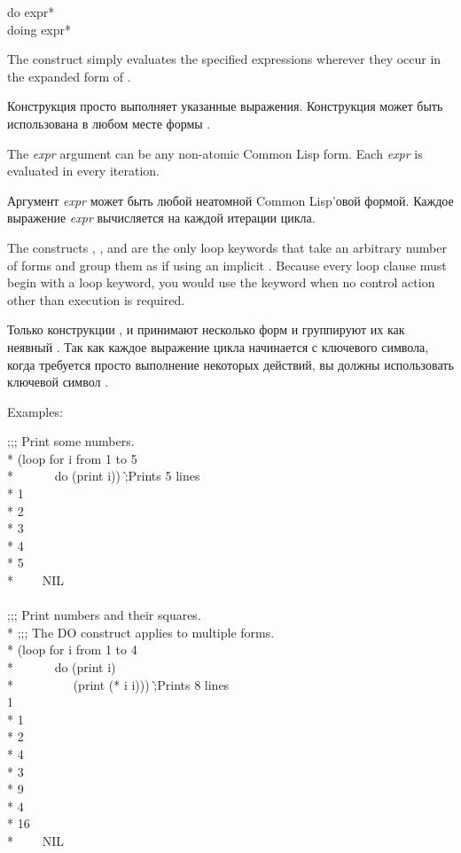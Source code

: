 \begin{defloop}
do {expr}* \\
doing {expr}*

The  construct simply evaluates the specified expressions
wherever they occur in the expanded form of .

Конструкция  просто выполняет указанные выражения. Конструкция
может быть использована в любом месте формы .

The \emph{expr\/} argument can be any non-atomic Common Lisp form.
Each \emph{expr\/} is evaluated in every iteration.

Аргумент \emph{expr} может быть любой неатомной Common Lisp'овой формой.
Каждое выражение \emph{expr} вычисляется на каждой итерации цикла.

The constructs , , and  are the
only loop keywords that take an arbitrary number of forms and group
them as if using an implicit .  
Because every loop clause must begin with a loop keyword, you would use
the keyword  when no control action other than execution is 
required.

Только конструкции ,  и  принимают
несколько форм и группируют их как неявный .  Так как
каждое выражение цикла  начинается с ключевого символа,
когда требуется просто выполнение некоторых действий, вы должны
использовать ключевой символ .

Examples:
\begin{lisp}
;;; Print some numbers. \\*
(loop for i from 1 to 5 \\*
~~~~~~do (print i)) \`;\textrm{Prints 5 lines} \\*
1 \\*
2 \\*
3 \\*
4 \\*
5 \\*
~~~\EV~NIL \\
 \\
;;; Print numbers and their squares. \\*
;;; The DO construct applies to multiple forms. \\*
(loop for i from 1 to 4 \\*
~~~~~~do (print i) \\*
~~~~~~~~~(print (* i i))) \`;\textrm{Prints 8 lines} \\
1  \\*
1  \\*
2  \\*
4  \\*
3  \\*
9  \\*
4  \\*
16  \\*
~~~\EV~NIL
\end{lisp}


\end{defloop}
